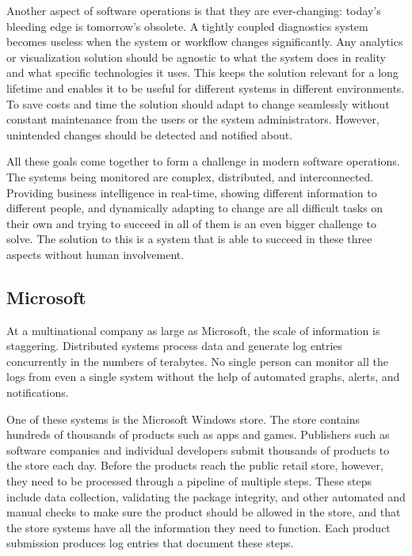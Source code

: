 Another aspect of software operations is that they are ever-changing: today's bleeding edge is tomorrow's obsolete. 
A tightly coupled diagnostics system becomes useless when the system or workflow changes significantly. 
Any analytics or visualization solution should be agnostic to what the system does in reality and what specific technologies it uses. 
This keeps the solution relevant for a long lifetime and enables it to be useful for different systems in different environments. 
To save costs and time the solution should adapt to change seamlessly without constant maintenance from the users or the system administrators. However, unintended changes should be detected and notified about.

All these goals come together to form a challenge in modern software operations.
The systems being monitored are complex, distributed, and interconnected.
Providing business intelligence in real-time, showing different information to different people, and dynamically adapting to change are all difficult tasks on their own and trying to succeed in all of them is an even bigger challenge to solve.
The solution to this is a system that is able to succeed in these three aspects without human involvement.

\subsection{Microsoft}
At a multinational company as large as Microsoft, the scale of information is staggering.
Distributed systems process data and generate log entries concurrently in the numbers of terabytes.
No single person can monitor all the logs from even a single system without the help of automated
graphs, alerts, and notifications.  

One of these systems is the Microsoft Windows store. The store contains hundreds of thousands of products
such as apps and games. Publishers such as software companies and individual developers submit thousands of 
products to the store each day. Before the products reach the public retail store, however, they need to be processed
through a pipeline of multiple steps. These steps include data collection, validating the package integrity, and
other automated and manual checks to make sure the product should be allowed in the store,
and that the store systems have all the information they need to function.
Each product submission produces log entries that document these steps.

